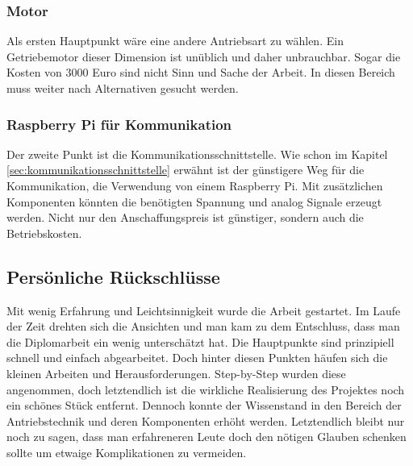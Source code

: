 \subsubsection{Motor}
\label{sec:verbesserungMotor}

Als ersten Hauptpunkt wäre eine andere Antriebsart zu wählen. Ein Getriebemotor dieser Dimension  ist unüblich und daher unbrauchbar. Sogar die Kosten von 3000 Euro sind nicht Sinn und Sache der Arbeit.  In diesen Bereich muss weiter nach Alternativen gesucht werden. 

\subsubsection{Raspberry Pi für Kommunikation}
\label{sec:raspberryPiKommunikation}

Der zweite Punkt ist die Kommunikationsschnittstelle. Wie schon im Kapitel \ref{sec:kommunikationsschnittstelle} erwähnt ist der günstigere Weg für die Kommunikation, die Verwendung von einem Raspberry Pi. Mit zusätzlichen Komponenten könnten die benötigten Spannung und analog Signale erzeugt werden. Nicht nur den Anschaffungspreis ist günstiger, sondern auch die Betriebskosten. 

\subsection{Persönliche Rückschlüsse}
\label{sec:persönlicheRückschlüsse}

Mit wenig Erfahrung und Leichtsinnigkeit wurde die Arbeit gestartet. Im Laufe der Zeit drehten sich die Ansichten und man kam zu dem Entschluss, dass man die Diplomarbeit ein wenig unterschätzt hat. Die Hauptpunkte sind prinzipiell schnell und einfach abgearbeitet. Doch hinter diesen Punkten häufen sich die kleinen Arbeiten und Herausforderungen. Step-by-Step wurden diese angenommen, doch letztendlich ist die wirkliche Realisierung des Projektes noch ein schönes Stück entfernt. Dennoch konnte der Wissenstand in den Bereich der Antriebstechnik und deren Komponenten erhöht werden. Letztendlich bleibt nur noch zu sagen, dass man erfahreneren Leute doch den nötigen Glauben schenken sollte um etwaige Komplikationen zu vermeiden. 

